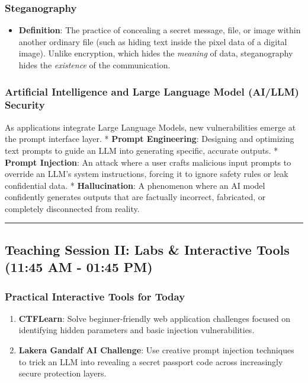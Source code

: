 \documentclass[12pt,openany]{book}
\begin{document}
\subsubsection*{Steganography}


\begin{itemize}

  \item \textbf{Definition}: The practice of concealing a secret message, file, or image within another ordinary file (such as hiding text inside the pixel data of a digital image). Unlike encryption, which hides the \textit{meaning} of data, steganography hides the \textit{existence} of the communication.

\end{itemize}


\subsubsection*{Artificial Intelligence and Large Language Model (AI/LLM) Security}


As applications integrate Large Language Models, new vulnerabilities emerge at the prompt interface layer.
* \textbf{Prompt Engineering}: Designing and optimizing text prompts to guide an LLM into generating specific, accurate outputs.
* \textbf{Prompt Injection}: An attack where a user crafts malicious input prompts to override an LLM's system instructions, forcing it to ignore safety rules or leak confidential data.
* \textbf{Hallucination}: A phenomenon where an AI model confidently generates outputs that are factually incorrect, fabricated, or completely disconnected from reality.


\medskip\noindent\rule{\linewidth}{0.4pt}\medskip

\medskip

\subsection*{Teaching Session II: Labs \& Interactive Tools (11:45 AM - 01:45 PM)}


\subsubsection*{Practical Interactive Tools for Today}


\begin{enumerate}

  \item \textbf{CTFLearn}: Solve beginner-friendly web application challenges focused on identifying hidden parameters and basic injection vulnerabilities.

  \item \textbf{Lakera Gandalf AI Challenge}: Use creative prompt injection techniques to trick an LLM into revealing a secret passport code across increasingly secure protection layers.

\end{enumerate}
\end{document}
